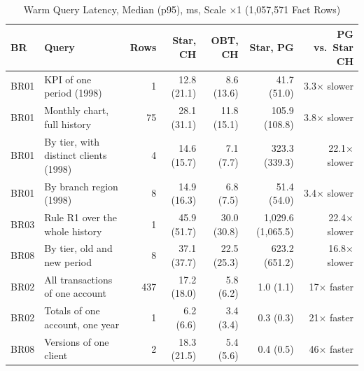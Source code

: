 \documentclass[peerreview]{IEEEtran}
\begin{document}
\begin{table}[!t]
\centering
\caption{Warm Query Latency, Median (p95), ms, Scale $\times$1 (1,057,571 Fact Rows)}
\label{tab:results}
\small
\begin{tabular}{l L{5.0cm} r r r r r}
\toprule
\textbf{BR} & \textbf{Query} & \textbf{Rows} & \textbf{Star, CH} & \textbf{OBT, CH} & \textbf{Star, PG} & \textbf{PG vs.\ Star CH} \\
\midrule
BR01 & KPI of one period (1998) & 1 & 12.8 (21.1) & 8.6 (13.6) & 41.7 (51.0) & 3.3$\times$ slower \\
BR01 & Monthly chart, full history & 75 & 28.1 (31.1) & 11.8 (15.1) & 105.9 (108.8) & 3.8$\times$ slower \\
BR01 & By tier, with distinct clients (1998) & 4 & 14.6 (15.7) & 7.1 (7.7) & 323.3 (339.3) & 22.1$\times$ slower \\
BR01 & By branch region (1998) & 8 & 14.9 (16.3) & 6.8 (7.5) & 51.4 (54.0) & 3.4$\times$ slower \\
BR03 & Rule R1 over the whole history & 1 & 45.9 (51.7) & 30.0 (30.8) & 1,029.6 (1,065.5) & 22.4$\times$ slower \\
BR08 & By tier, old and new period & 8 & 37.1 (37.7) & 22.5 (25.3) & 623.2 (651.2) & 16.8$\times$ slower \\
BR02 & All transactions of one account & 437 & 17.2 (18.0) & 5.8 (6.2) & 1.0 (1.1) & 17$\times$ faster \\
BR02 & Totals of one account, one year & 1 & 6.2 (6.6) & 3.4 (3.4) & 0.3 (0.3) & 21$\times$ faster \\
BR08 & Versions of one client & 2 & 18.3 (21.5) & 5.4 (5.6) & 0.4 (0.5) & 46$\times$ faster \\
\bottomrule
\end{tabular}
\end{table}
\end{document}
